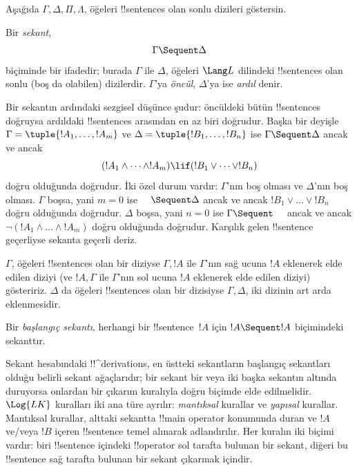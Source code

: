 \documentclass[../../../include/open-logic-section]{subfiles}
\begin{document}
      {}
      {}


Aşağıda $\Gamma, \Delta, \Pi, \Lambda$, öğeleri !!{sentence}s olan sonlu
dizileri göstersin.

\begin{defn}[Sekant]
Bir \emph{sekant},
\[
\Gamma \Sequent \Delta
\]
biçiminde bir ifadedir; burada $\Gamma$ ile $\Delta$, öğeleri $\Lang L$
dilindeki !!{sentence}s olan sonlu (boş da olabilen) dizilerdir. $\Gamma$'ya
\emph{öncül}, $\Delta$'ya ise \emph{ardıl} denir.
\end{defn}

\begin{explain}
Bir sekantın ardındaki sezgisel düşünce şudur: öncüldeki bütün !!{sentence}s
doğruysa ardıldaki !!{sentence}s arasından en az biri doğrudur. Başka bir
deyişle $\Gamma = \tuple{!A_1, \dots, !A_m}$ ve $\Delta = \tuple{!B_1,
\dots, !B_n}$ ise $\Gamma \Sequent \Delta$ ancak ve ancak
\[
(!A_1 \land \cdots \land !A_m) \lif (!B_1 \lor \cdots \lor
!B_n)
\]
doğru olduğunda doğrudur. İki özel durum vardır: $\Gamma$'nın boş olması ve
$\Delta$'nın boş olması. $\Gamma$ boşsa, yani $m=0$ ise $\quad \Sequent
\Delta$ ancak ve ancak $!B_1 \lor \dots \lor !B_n$ doğru olduğunda
doğrudur. $\Delta$ boşsa, yani $n=0$ ise $\Gamma \Sequent \quad$ ancak ve
ancak $\lnot(!A_1 \land \dots \land !A_m)$ doğru olduğunda doğrudur.
Karşılık gelen !!{sentence} geçerliyse sekanta geçerli deriz.
\end{explain}

$\Gamma$, öğeleri !!{sentence}s olan bir diziyse $\Gamma,!A$ ile $\Gamma$'nın sağ ucuna
$!A$ eklenerek elde edilen diziyi (ve $!A,\Gamma$ ile $\Gamma$'nın sol ucuna
$!A$ eklenerek elde edilen diziyi) gösteririz. $\Delta$ da öğeleri !!{sentence}s olan bir
dizisiyse $\Gamma,\Delta$, iki dizinin art arda eklenmesidir.

\begin{defn}
Bir \emph{başlangıç sekantı}, herhangi bir !!{sentence}~$!A$ için
{$!A \Sequent !A$ biçimindeki sekanttır}.
\end{defn}

Sekant hesabındaki !!^{derivation}s, en üstteki sekantların başlangıç
sekantları olduğu belirli sekant ağaçlarıdır; bir sekant bir veya iki başka
sekantın altında duruyorsa onlardan bir çıkarım kuralıyla doğru biçimde elde
edilmelidir. $\Log{LK}$ kuralları iki ana türe ayrılır: \emph{mantıksal}
kurallar ve \emph{yapısal} kurallar. Mantıksal kurallar, alttaki sekantta
!!{main operator} konumunda duran ve $!A$ ve/veya $!B$ içeren
!!{sentence} temel alınarak adlandırılır. Her kuralın iki biçimi vardır: biri
!!{sentence} içindeki !!{operator} sol tarafta bulunan bir sekant, diğeri bu !!{sentence}
sağ tarafta bulunan bir sekant çıkarmak içindir.
\end{document}
